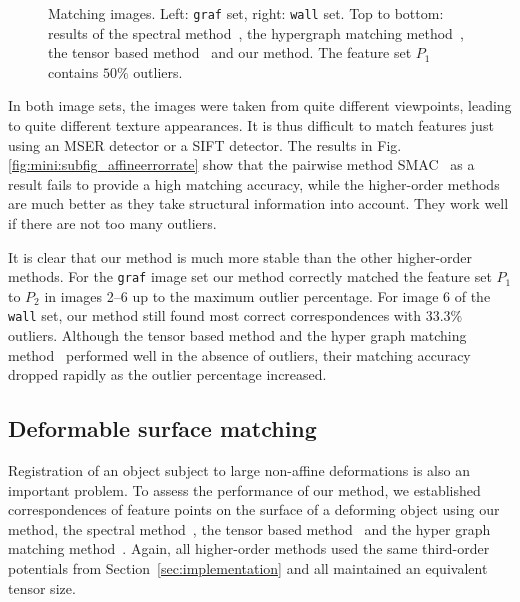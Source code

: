 \begin{figure}[!t]
\begin{minipage}[b]{0.4\textwidth}
{            }%
        \end{minipage}%
        \caption{Matching images. Left: \texttt{graf} set, right: \texttt{wall} set. Top to bottom: results of the spectral method~\cite{Cour06}, the hypergraph matching method~\cite{Zass08}, the tensor based method~\cite{Duchenne_etal09} and our method. The feature set $P_1$ contains $50\%$ outliers. }
\label{fig:mini:subfig_affinematchingimages} %
\end{figure}%

In both image sets, the images were taken from quite different viewpoints, leading to quite different texture appearances. It is thus difficult to match features just using an MSER detector or a SIFT detector.
The results in Fig.\ref{fig:mini:subfig_affineerrorrate} show that the pairwise method SMAC~\cite{Cour06} as a result fails to provide a high matching accuracy, while the higher-order methods are much better as they take structural information
into account. They work well if there are not too many outliers.

It is clear that our method is much more stable than the other higher-order methods. For the \texttt{graf} image set our method correctly matched the feature set $P_1$ to $P_2$ in images 2--6 up to the maximum outlier percentage. For image 6 of the \texttt{wall} set, our method still found most correct correspondences with $33.3\%$ outliers. Although the tensor based method and the hyper graph matching method~\cite{Zass08} performed well in the absence of outliers, their matching accuracy dropped rapidly as the outlier percentage increased.

\subsection{Deformable surface matching}
\label{subsec:deformabledata}

Registration of an object subject to large non-affine deformations is also an important problem. To assess the performance of our method, we established correspondences of feature points on the surface of a deforming object using our method, the spectral method~\cite{Cour06}, the tensor based method~\cite{Duchenne_etal09} and the hyper graph matching method~\cite{Zass08}. Again, all higher-order methods used the same third-order potentials from Section~\ref{sec:implementation} and all maintained an equivalent tensor size.

